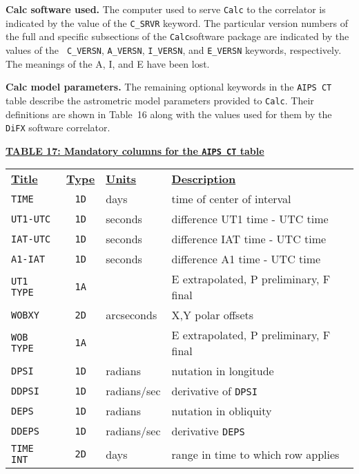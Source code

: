 \documentclass[twoside]{article}
\begin{document}
{\bf Calc software used.} The computer used to serve {\tt Calc} to the
correlator is indicated by the value of the {\tt C\_SRVR} keyword.
The particular version numbers of the full and specific subsections of
the {\tt Calc}software package are indicated by the values of the {\tt
  C\_VERSN}, {\tt A\_VERSN}, {\tt I\_VERSN}, and {\tt E\_VERSN}
keywords, respectively.  The meanings of the A, I, and E have been
lost.

{\bf Calc model parameters.} The remaining optional keywords in the
{\tt AIPS CT} table describe the astrometric model parameters
provided to {\tt Calc}.  Their definitions are shown in Table~16 along
with the values used for them by the {\tt DiFX} software correlator.

\begin{center}
\underline{\bf{TABLE 17: Mandatory columns for the {\tt AIPS CT} table}}\\
\begin{tabular}{lcll}
\noalign{\vspace{2pt}} \label{ta:CTcols}
\underline{{\bf Title\vphantom{y}}} & \underline{\bf{Type}} &
   \underline{{\bf Units\vphantom{y}}} & \underline{\bf{Description}} \\
\noalign{\vspace{2pt}}
{\tt TIME}     & {\tt 1D} & days    & time of center of interval \\
{\tt UT1-UTC}  & {\tt 1D} & seconds & difference UT1 time - UTC time \\
{\tt IAT-UTC}  & {\tt 1D} & seconds & difference IAT time - UTC time \\
{\tt A1-IAT}   & {\tt 1D} & seconds & difference A1 time - UTC time \\
{\tt UT1 TYPE} & {\tt 1A} &         & E extrapolated, P preliminary, F final \\
{\tt WOBXY}    & {\tt 2D} & arcseconds & X,Y polar offsets \\
{\tt WOB TYPE} & {\tt 1A} &         & E extrapolated, P preliminary, F final \\
{\tt DPSI}     & {\tt 1D} & radians & nutation in longitude \\
{\tt DDPSI}    & {\tt 1D} & radians/sec & derivative of {\tt DPSI} \\
{\tt DEPS}     & {\tt 1D} & radians & nutation in obliquity \\
{\tt DDEPS}    & {\tt 1D} & radians/sec & derivative {\tt DEPS} \\
{\tt TIME INT} & {\tt 2D} & days    & range in time to which row applies
\end{tabular}
\end{center}
\end{document}
